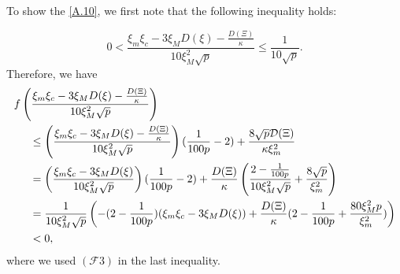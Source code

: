 \documentclass[11pt,reqno]{amsart}
\numberwithin{figure}{section}
\newcommand{\kp}{\kappa}
\begin{document}
To show the \eqref{A.10}, we first note that the following inequality holds:

\[0<\frac{\xi_m\xi_c-3\xi_MD(\xi)-\frac{D(\Xi)}{\kappa}}{10 \xi_M^2 \sqrt p}\leq \frac{1}{10\sqrt{p}}. \]
Therefore, we have 
\[\begin{aligned}
	&f\left(\frac{\xi_m\xi_c-3\xi_MD(\xi)-\frac{D(\Xi)}{\kappa}}{10 \xi_M^2 \sqrt p}\right)\\
	&\hspace{0.5cm}\leq \left(\frac{\xi_m\xi_c-3\xi_MD(\xi)-\frac{D(\Xi)}{\kappa}}{10 \xi_M^2 \sqrt p}\right)(\frac{1}{100p}-2)+\frac{8\sqrt p \mathcal D(\Xi)}{\kp \xi_m^2}\\
	&\hspace{0.5cm}=\left(\frac{\xi_m\xi_c-3\xi_MD(\xi)}{10 \xi_M^2 \sqrt p}\right)(\frac{1}{100p}-2)+\frac{D(\Xi)}{\kappa}\left(\frac{2-\frac{1}{100p}}{10\xi_M^2\sqrt{p}}+\frac{8\sqrt{p}}{\xi_m^2} \right)\\
	&\hspace{0.5cm}=\frac{1}{10\xi_M^2\sqrt{p}}\left(-(2-\frac{1}{100p})(\xi_m\xi_c-3\xi_MD(\xi))+\frac{D(\Xi)}{\kappa}(2-\frac{1}{100p}+\frac{80\xi_M^2p}{\xi_m^2} ) \right)\\
	&\hspace{0.5cm}<0,
\end{aligned} \]
where we used $(\mathcal{F}3)$ in the last inequality.
\end{document}

